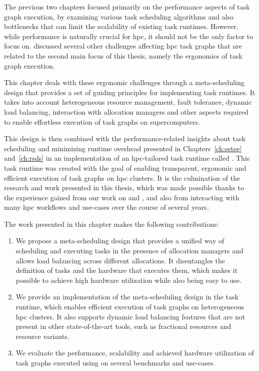 The previous two chapters focused primarily on the performance aspects of task graph execution, by
examining various task scheduling algorithms and also bottlenecks that can limit the scalability of
existing task runtimes. However, while performance is naturally crucial for
\gls{hpc}, it should not be the only factor to focus on. 
discussed several other challenges affecting \gls{hpc} task graphs that are related
to the second main focus of this thesis, namely the ergonomics of task graph execution.

This chapter deals with these ergonomic challenges through a meta-scheduling design that provides a
set of guiding principles for implementing task runtimes. It takes into account heterogeneous
resource management, fault tolerance, dynamic load balancing, interaction with allocation managers
and other aspects required to enable effortless execution of task graphs on supercomputers.

This design is then combined with the performance-related insights about task scheduling and
minimizing runtime overhead presented in Chapters~\ref{ch:estee}
and~\ref{ch:rsds} in an implementation of an \gls{hpc}-tailored task
runtime called \hyperqueue{}. This task runtime was created with the goal of enabling
transparent, ergonomic and efficient execution of task graphs on \gls{hpc} clusters.
It is the culmination of the research and work presented in this thesis, which was made possible
thanks to the experience gained from our work on \estee{} and
\rsds{}, and also from interacting with many \gls{hpc} workflows and
use-cases over the course of several years.

The work presented in this chapter makes the following contributions:
\begin{enumerate}
	\item We propose a meta-scheduling design that provides a unified way of scheduling and executing tasks
	      in the presence of allocation managers and allows load balancing across different allocations. It
	      disentangles the definition of tasks and the hardware that executes them, which makes it possible
	      to achieve high hardware utilization while also being easy to use.
	\item We provide an implementation of the meta-scheduling design in the \hyperqueue{} task
	      runtime, which enables efficient execution of task graphs on heterogeneous \gls{hpc}
	      clusters. It also supports dynamic load balancing features that are not present in other
	      state-of-the-art tools, such as fractional resources and resource variants.
	\item We evaluate the performance, scalability and achieved hardware utilization of task graphs executed
	      using \hyperqueue{} on several benchmarks and use-cases.
\end{enumerate}


